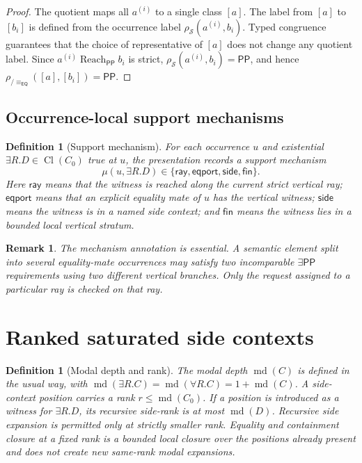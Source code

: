 \documentclass[11pt]{article}
\newtheorem{definition}[theorem]{Definition}
\newtheorem{remark}[theorem]{Remark}
\newcommand{\EQ}{\mathsf{EQ}}
\newcommand{\PP}{\mathsf{PP}}
\newcommand{\Cl}{\operatorname{Cl}}
\newcommand{\md}{\operatorname{md}}
\newcommand{\eqc}{\equiv_{\EQ}}
\newcommand{\reach}{\operatorname{Reach}}
\newcommand{\side}{\mathsf{side}}
\newcommand{\fin}{\mathsf{fin}}
\newcommand{\ray}{\mathsf{ray}}
\newcommand{\eport}{\mathsf{eqport}}
\begin{document}
\begin{proof}
The quotient maps all $a^{(i)}$ to a single class $[a]$.  The label from $[a]$ to $[b_i]$ is defined from the occurrence label $\rho_\mathcal S(a^{(i)},b_i)$.  Typed congruence guarantees that the choice of representative of $[a]$ does not change any quotient label.  Since $a^{(i)}\reach_\PP b_i$ is strict, $\rho_\mathcal S(a^{(i)},b_i)=\PP$, and hence $\rho_{/\eqc}([a],[b_i])=\PP$.
\end{proof}



\subsection{Occurrence-local support mechanisms}
\begin{definition}[Support mechanism]
For each occurrence $u$ and existential $\exists R.D\in\Cl(C_0)$ true at $u$, the presentation records a support mechanism
\[
  \mu(u,\exists R.D)\in
  \{\ray,\eport,\side,\fin\}.
\]
Here $\ray$ means that the witness is reached along the current strict vertical ray; $\eport$ means that an explicit equality mate of $u$ has the vertical witness; $\side$ means the witness is in a named side context; and $\fin$ means the witness lies in a bounded local vertical stratum.
\end{definition}

\begin{remark}
The mechanism annotation is essential.  A semantic element split into several equality-mate occurrences may satisfy two incomparable $\exists\PP$ requirements using two different vertical branches.  Only the request assigned to a particular ray is checked on that ray.
\end{remark}


\section{Ranked saturated side contexts}

\begin{definition}[Modal depth and rank]
The modal depth $\md(C)$ is defined in the usual way, with $\md(\exists R.C)=\md(\forall R.C)=1+\md(C)$.  A side-context position carries a rank $r\leq \md(C_0)$.  If a position is introduced as a witness for $\exists R.D$, its recursive side-rank is at most $\md(D)$.  Recursive side expansion is permitted only at strictly smaller rank.  Equality and containment closure at a fixed rank is a bounded local closure over the positions already present and does not create new same-rank modal expansions.
\end{definition}
\end{document}
